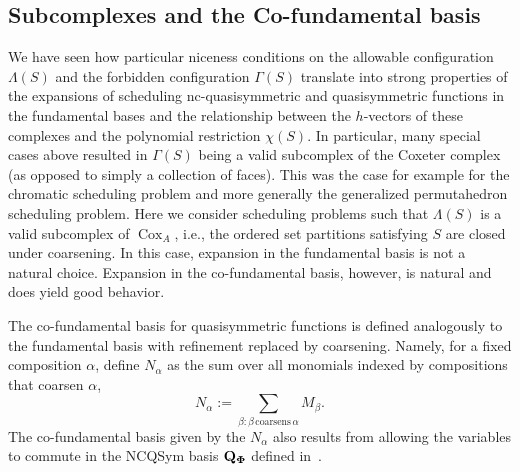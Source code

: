 \documentclass[12pt,reqno]{amsart}
\numberwithin{definition}{section}
\theoremstyle{definition}
\newcommand{\cox}{\operatorname{Cox}}
\newcommand{\ncM}{\mathcal{M}}
\newcommand{\ncN}{\mathcal{N}}
\newcommand{\allow}{\Lambda} %
\newcommand{\poly}{\chi} %
\newcommand{\forb}{\Gamma} %
\begin{document}
\subsection{Subcomplexes and the Co-fundamental basis}
\label{sec:cofundamental}


We have seen how particular niceness conditions on the allowable
configuration $\allow(S)$ and the forbidden configuration $\forb(S)$
translate into strong properties of the expansions of scheduling nc-quasisymmetric and quasisymmetric functions  in the fundamental bases and the relationship between the
$h$-vectors of these complexes and the polynomial restriction
$\poly(S)$. 
 In particular, many special cases above resulted in
$\forb(S)$ being a valid subcomplex of the Coxeter complex (as
opposed to simply a collection of faces). This was the case for example for the chromatic scheduling problem and more generally the generalized permutahedron scheduling problem. 
 Here we consider scheduling problems such that $\allow(S)$ is a valid
 subcomplex of $\cox_A$, i.e., the ordered set partitions satisfying
 $S$ are closed under coarsening.  In this case, expansion in the
 fundamental basis is not a natural choice.  Expansion in the
 co-fundamental basis, however, is natural and does yield good
 behavior. 

 The co-fundamental basis for quasisymmetric functions is
 defined analogously to the fundamental basis with refinement replaced by coarsening.  Namely, for a fixed composition $\alpha$, define $N_{\alpha}$ as the sum over all monomials indexed by compositions that coarsen $\alpha$,
$$N_{\alpha} := \sum_{\beta : \beta \, \textrm{coarsens} \, \alpha} M_{\beta}.$$
The co-fundamental basis given by the $N_{\alpha}$ also results from allowing the variables to commute in the NCQSym basis ${\bf {Q}_{\Phi}}$ defined in~\cite{Zab}.



\end{document}
